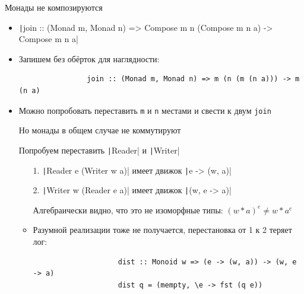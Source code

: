     \begin{frame}[fragile]{Монады не композируются \popslide}
        \vspace{-0.5em}
        \begin{itemize}
            \item \texttt|join :: (Monad m, Monad n) => Compose m n (Compose m n a) -> Compose m n a|
            \item Запишем без обёрток для наглядности:
            \begin{verbatim}
                join :: (Monad m, Monad n) => m (n (m (n a))) -> m (n a)
            \end{verbatim}
            \item Можно попробовать переставить \texttt{m} и \texttt{n} местами и свести к двум \texttt{join}
            \item[\NB] Но монады в общем случае не коммутируют
            \item[\eg] Попробуем переставить \texttt|Reader| и \texttt|Writer|
            \begin{itemize}
                \item[1.] \texttt|Reader e (Writer w a)| имеет движок \texttt|e -> (w, a)|
                \item[2.] \texttt|Writer w (Reader e a)| имеет движок \texttt|(w, e -> a)|
                \item[\advanced] Алгебраически видно, что это не изоморфные типы: $(w * a)^e \neq w * a ^ e$
                \item Разумной реализации тоже не получается, перестановка от 1 к 2 теряет лог:
                \begin{verbatim}
                    dist :: Monoid w => (e -> (w, a)) -> (w, e -> a)
                    dist q = (mempty, \e -> fst (q e))
                \end{verbatim}
            \end{itemize}
        \end{itemize}
    \end{frame}



